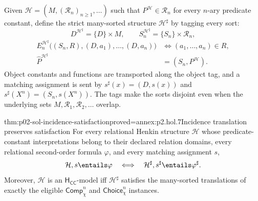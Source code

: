 Given \(\mathcal H=(M,(\mathcal R_n)_{n\geq1},\ldots)\) such that
\(P^{\mathcal H}\in\mathcal R_n\) for every \(n\)-ary predicate constant,
define the strict many-sorted structure \(\mathcal H^\sharp\) by tagging every
sort:
\[
 D^{\mathcal H^\sharp}=\{D\}\times M,
 \qquad S_n^{\mathcal H^\sharp}=\{S_n\}\times\mathcal R_n,
\]
\[
\begin{aligned}
 E_n^{\mathcal H^\sharp}
   \bigl((S_n,R),(D,a_1),\ldots,(D,a_n)\bigr)
 &\Longleftrightarrow(a_1,\ldots,a_n)\in R,\\
 \widehat P^{\mathcal H^\sharp}&=(S_n,P^{\mathcal H}).
\end{aligned}
\]
Object constants and functions are transported along the object tag, and a
matching assignment is sent by
\(s^\sharp(x)=(D,s(x))\) and
\(s^\sharp(X^n)=(S_n,s(X^n))\).  The tags make the sorts disjoint even when
the underlying sets \(M,\mathcal R_1,\mathcal R_2,\ldots\) overlap.

\begin{hbtheorem}{thm:p02-sol-incidence-satisfaction}{proved=annex:p2.hol.7}{Incidence translation preserves satisfaction}
For every relational Henkin structure \(\mathcal H\) whose predicate-constant
interpretations belong to their declared relation domains, every relational
second-order formula \(\varphi\), and every matching assignment \(s\),
\[
 \mathcal H,s\entails\varphi
 \quad\Longleftrightarrow\quad
 \mathcal H^\sharp,s^\sharp\entails\varphi^\sharp.
\]
Moreover, \(\mathcal H\) is an \(\mathsf H_{\mathsf{CC}}\)-model iff
\(\mathcal H^\sharp\) satisfies the many-sorted translations of exactly the
eligible \(\mathsf{Comp}_{\chi}^{n}\) and
\(\mathsf{Choice}_{\chi}^{n}\) instances.
\end{hbtheorem}

